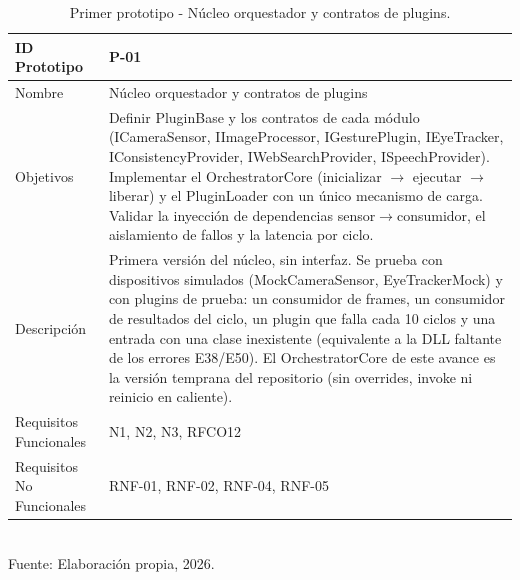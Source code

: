 
\begin{table}[h!]
\centering
\caption{Primer prototipo - Núcleo orquestador y contratos de plugins.}
\label{tab:prototipo-p01}
\begin{tabularx}{\textwidth}{|l|X|}
\hline
ID Prototipo & P-01 \\ \hline
Nombre & Núcleo orquestador y contratos de plugins \\ \hline
Objetivos & Definir PluginBase y los contratos de cada módulo (ICameraSensor, IImageProcessor, IGesturePlugin, IEyeTracker, IConsistencyProvider, IWebSearchProvider, ISpeechProvider). \newline Implementar el OrchestratorCore (inicializar $\rightarrow$ ejecutar $\rightarrow$ liberar) y el PluginLoader con un único mecanismo de carga. \newline Validar la inyección de dependencias sensor$\rightarrow$consumidor, el aislamiento de fallos y la latencia por ciclo. \\ \hline
Descripción & Primera versión del núcleo, sin interfaz. Se prueba con dispositivos simulados (MockCameraSensor, EyeTrackerMock) y con plugins de prueba: un consumidor de frames, un consumidor de resultados del ciclo, un plugin que falla cada 10 ciclos y una entrada con una clase inexistente (equivalente a la DLL faltante de los errores E38/E50). El OrchestratorCore de este avance es la versión temprana del repositorio (sin overrides, invoke ni reinicio en caliente). \\ \hline
Requisitos Funcionales & N1, N2, N3, RFCO12 \\ \hline
Requisitos No Funcionales & RNF-01, RNF-02, RNF-04, RNF-05 \\ \hline
\end{tabularx}
\\[2pt] {\small Fuente: Elaboración propia, 2026.}
\end{table}

